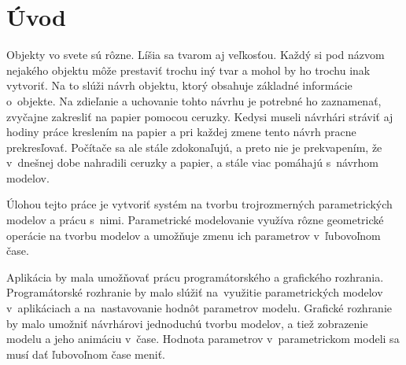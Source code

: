 


\lstset {language=C++,
basicstyle=\ttfamily,
  columns=fullflexible,
  breaklines=true,
  escapechar=\&
  }

\listoftodos[Todos]

\chapter{Úvod}

Objekty vo svete sú rôzne. Líšia sa tvarom aj veľkosťou. 
Každý si pod názvom nejakého objektu môže prestaviť trochu iný tvar a mohol by ho trochu inak vytvoriť. Na to slúži návrh objektu, ktorý obsahuje základné informácie o~objekte. Na zdieľanie a uchovanie tohto návrhu je potrebné ho zaznamenať, zvyčajne zakresliť  na papier pomocou ceruzky. Kedysi museli návrhári stráviť aj hodiny práce kreslením na papier a pri každej zmene tento návrh pracne prekresľovať. 
Počítače sa ale stále zdokonaľujú, a preto nie je prekvapením, že v~dnešnej dobe nahradili ceruzky a papier, a stále viac pomáhajú s~návrhom modelov.






Úlohou tejto práce je vytvoriť systém na tvorbu trojrozmerných parametrických modelov a prácu s~nimi. Parametrické modelovanie využíva rôzne geometrické operácie na tvorbu modelov a umožňuje zmenu ich parametrov v~ľubovoľnom čase. 



Aplikácia by mala umožňovať prácu programátorského a grafického rozhrania. Programátorské rozhranie by malo slúžiť na~využitie parametrických modelov v~aplikáciach a na~nastavovanie hodnôt parametrov modelu. Grafické rozhranie by malo umožniť návrhárovi jednoduchú tvorbu modelov, a tiež zobrazenie modelu a jeho animáciu v~čase. Hodnota parametrov v~parametrickom modeli sa musí dať ľubovoľnom čase meniť.

